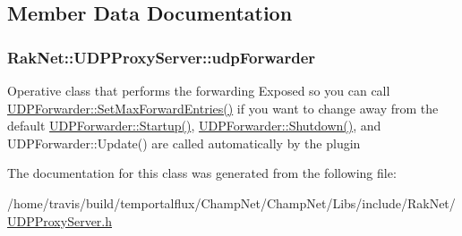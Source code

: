 \subsection{Member Data Documentation}
\hypertarget{class_rak_net_1_1_u_d_p_proxy_server_a7664fd65087f57acc4d2c602a1a30d24}{
\subsubsection[{udp\-Forwarder}]{ Rak\-Net\-::\-U\-D\-P\-Proxy\-Server\-::udp\-Forwarder}}\label{class_rak_net_1_1_u_d_p_proxy_server_a7664fd65087f57acc4d2c602a1a30d24}
Operative class that performs the forwarding Exposed so you can call \hyperlink{class_rak_net_1_1_u_d_p_forwarder_a59d01c307683affb6ecf8c6a2e18d7ca}{U\-D\-P\-Forwarder\-::\-Set\-Max\-Forward\-Entries()} if you want to change away from the default \hyperlink{class_rak_net_1_1_u_d_p_forwarder_a33db580779b6bc0c52e82c18c9f82e0e}{U\-D\-P\-Forwarder\-::\-Startup()}, \hyperlink{class_rak_net_1_1_u_d_p_forwarder_a601f4783a6c32353a99c26d0996f0500}{U\-D\-P\-Forwarder\-::\-Shutdown()}, and U\-D\-P\-Forwarder\-::\-Update() are called automatically by the plugin 

The documentation for this class was generated from the following file\-:\begin{DoxyCompactItemize}
\item 
/home/travis/build/temportalflux/\-Champ\-Net/\-Champ\-Net/\-Libs/include/\-Rak\-Net/\hyperlink{_u_d_p_proxy_server_8h}{U\-D\-P\-Proxy\-Server.\-h}\end{DoxyCompactItemize}
